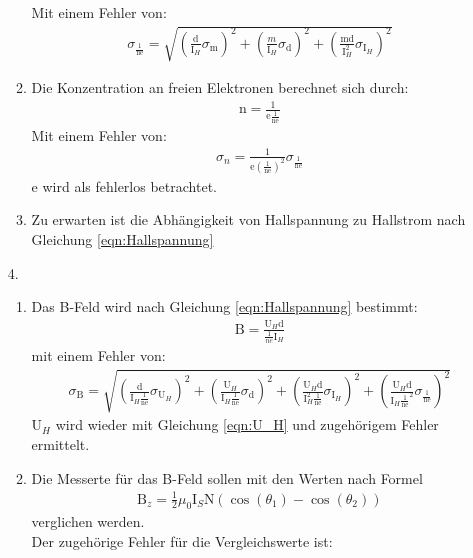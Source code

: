 \documentclass[12pt]{scrartcl}
\begin{document}
\begin{enumerate}
\begin{enumerate}
Mit einem Fehler von:
\begin{align}
\sigma_{\frac{1}{\text{ne}}} = 
\sqrt{\left(\frac{\text{d}}
{\text{I}_H}\sigma_{\text{m}}\right)^2+
\left(\frac{m}
{\text{I}_H}\sigma_{\text{d}}\right)^2+
\left(\frac{\text{m} \text{d}}
{\text{I}_H^2}\sigma_{\text{I}_H}\right)^2}
\label{eqn:Hallspannung_Fehler}
\end{align}
\item
Die Konzentration an freien Elektronen berechnet sich durch:
\begin{align}
\text{n} = \frac{1}{\text{e}\frac{1}{\text{ne}}}
\label{eqn:freie_elektronen}
\end{align}
Mit einem Fehler von:
\begin{align}
\sigma_n = \frac{1}{\text{e}\left(\frac{1}{\text{ne}}\right)^2}\sigma_{\frac{1}{\text{ne}}}
\label{eqn:freie_elektronen_sigma}
\end{align}
e wird als fehlerlos betrachtet.
\item
Zu erwarten ist die Abhängigkeit von Hallspannung zu Hallstrom nach Gleichung \ref{eqn:Hallspannung}
\end{enumerate}
\item[4.]
\begin{enumerate}
\item
Das B-Feld wird nach Gleichung \ref{eqn:Hallspannung} bestimmt:
\begin{align*}
 \text{B}= \frac{\text{U}_H \text{d}}{\frac{1}{ne} \text{I}_H}
\end{align*}
mit einem Fehler von:
\begin{align}
\sigma_{\text{B}} = 
\sqrt{\left(\frac{\text{d}}
{\text{I}_H \frac{1}{\text{ne}}}\sigma_{\text{U}_H}\right)^2+
\left(\frac{\text{U}_H}
{\text{I}_H \frac{1}{\text{ne}}}\sigma_{\text{d}}\right)^2+
\left(\frac{\text{U}_H \text{d}}
{\text{I}_H^2 \frac{1}{\text{ne}}}\sigma_{\text{I}_H}\right)^2+
\left(\frac{\text{U}_H \text{d}}
{\text{I}_H \frac{1}{\text{ne}}^2}\sigma_{\frac{1}{\text{ne}}}\right)^2}
\end{align}
U$_H$ wird wieder mit Gleichung \ref{eqn:U_H}
und zugehörigem Fehler ermittelt.
\item
Die Messerte für das B-Feld sollen mit den Werten nach Formel
\begin{align}
\text{B}_z = \frac{1}{2} \mu_0 \text{I}_S \text{N} (\cos(\theta_1) - \cos(\theta_2))
\label{eqn:Aufgabe 3_TD_B-Feld_1} 
\end{align}
verglichen werden.\\
Der zugehörige Fehler für die Vergleichswerte ist:

\end{enumerate}
\end{enumerate}
\end{document}

